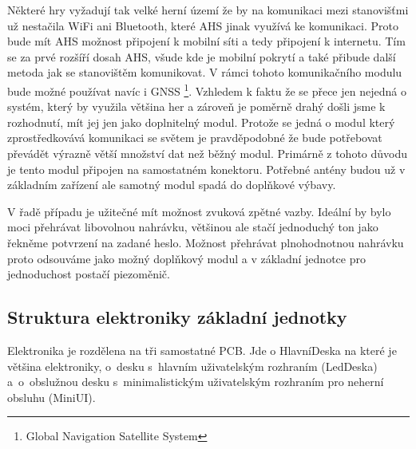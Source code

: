 Některé hry vyžadují tak velké herní území že by na komunikaci mezi stanovišťmi už nestačila WiFi ani Bluetooth, které AHS jinak využívá ke komunikaci.  
Proto bude mít AHS možnost připojení k mobilní síti a tedy připojení k internetu.
Tím se za prvé rozšíří dosah AHS, všude kde je mobilní pokrytí a také přibude další metoda jak se stanovištěm komunikovat.
V rámci tohoto komunikačního modulu bude možné používat navíc i GNSS \footnote{Global Navigation Satellite System}.
Vzhledem k faktu že se přece jen nejedná o systém, který by využila většina her a zároveň je poměrně drahý došli jsme k rozhodnutí, mít jej jen jako doplnitelný modul.
Protože se jedná o modul který zprostředkovává komunikaci se světem je pravděpodobné že bude potřebovat převádět výrazně větší množství dat než běžný modul.
Primárně z tohoto důvodu je tento modul připojen na samostatném konektoru.
Potřebné antény budou už v základním zařízení ale samotný modul spadá do doplňkové výbavy.

V řadě případu je užitečné mít možnost zvuková zpětné vazby.
Ideální by bylo moci přehrávat libovolnou nahrávku, většinou ale stačí jednoduchý ton jako řekněme potvrzení na zadané heslo.
Možnost přehrávat plnohodnotnou nahrávku proto odsouváme jako možný doplňkový modul a v základní jednotce pro jednoduchost postačí piezoměnič. 



\subsection{Struktura elektroniky základní jednotky}

Elektronika je rozdělena na tři samostatné PCB.
Jde o HlavníDeska na které je většina elektroniky, o~desku s~hlavním uživatelským rozhraním (LedDeska) a~o~obslužnou desku s~minimalistickým uživatelským rozhraním pro neherní obsluhu (MiniUI).

